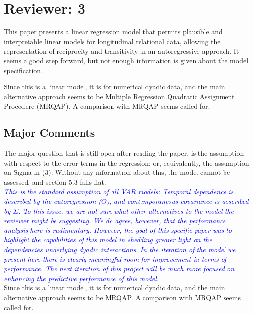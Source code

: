 \section{Reviewer: 3}

This paper presents a linear regression model that permits plausible and interpretable linear models for longitudinal relational data, allowing the representation of reciprocity and transitivity in an autoregressive approach. It seems a good step forward, but not enough information is given about the model specification. 

Since this is a linear model, it is for numerical dyadic data, and the main alternative approach seems to be Multiple Regression Quadratic Assignment Procedure (MRQAP). A comparison with MRQAP seems called for.

\subsection{Major Comments}

The major question that is still open after reading the paper, is the assumption with respect to the error terms in the regression; or, equivalently, the assumption on Sigma in (3). Without any information about this, the model cannot be assessed, and section 5.3 falls flat. \\

\textcolor{blue}{\emph{
	This is the standard assumption of all VAR models: Temporal dependence is described by the autoregression ($\Theta$), and contemporaneous covariance is described by $\Sigma$. To this issue, we are not sure what other alternatives to the model the reviewer might be suggesting. We do agree, however, that the performance analysis here is rudimentary. However, the goal of this specific paper was to highlight the capabilities of this model in shedding greater light on the dependencies underlying dyadic interactions. In the iteration of the model we present here there is clearly meaningful room for improvement in terms of performance. The next iteration of this project will be much more focused on enhancing the predictive performance of this model.
}} \\

Since this is a linear model, it is for numerical dyadic data, and the main alternative approach seems to be MRQAP. A comparison with MRQAP seems called for. \\

